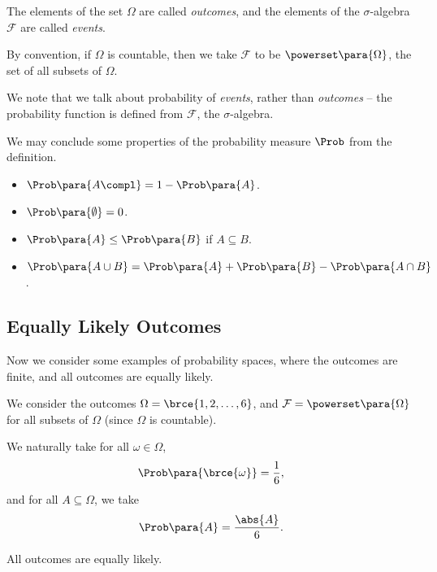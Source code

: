\begin{definition}
    \label{def:outcome-event}%
    The elements of the set \(\Omega\) are called \emph{outcomes}, and the elements of the \(\sigma\)-algebra \(\mathcal{F}\) are called \emph{events}.
\end{definition}

\begin{remark}
    By convention, if \(\Omega\) is countable, then we take \(\mathcal{F}\) to be \(\powerset\para{\Omega}\), the set of all subsets of \(\Omega\).
\end{remark}

We note that we talk about probability of \emph{events}, rather than \emph{outcomes} -- the probability function is defined from \(\mathcal{F}\), the \(\sigma\)-algebra.

We may conclude some properties of the probability measure \(\Prob\) from the definition.

\begin{proposition}
    \label{prop:properties-prob}%
    \begin{itemize}
        \item \(\Prob\para{A\compl} = 1 - \Prob\para{A}\).
        \item \(\Prob\para{\emptyset} = 0\).
        \item \(\Prob\para{A} \leq \Prob\para{B}\) if \(A \subseteq B\).
        \item \(\Prob\para{A \cup B} = \Prob\para{A} + \Prob\para{B} - \Prob\para{A \cap B}\).
    \end{itemize}
\end{proposition}

\subsection{Equally Likely Outcomes}
Now we consider some examples of probability spaces, where the outcomes are finite, and all outcomes are equally likely.

\begin{example}
    \label{ex:rolling-a-fair-die}%
    We consider the outcomes \(\Omega = \brce{1, 2, \ldots, 6}\), and \(\mathcal{F} = \powerset\para{\Omega}\) for all subsets of \(\Omega\) (since \(\Omega\) is countable).
        
    We naturally take for all \(\omega \in \Omega\),
    \[
        \Prob\para{\brce{\omega}} = \frac{1}{6},
    \]
    and for all \(A \subseteq \Omega\), we take
    \[
        \Prob\para{A} = \frac{\abs{A}}{6}.
    \]

    All outcomes are equally likely.
\end{example}


